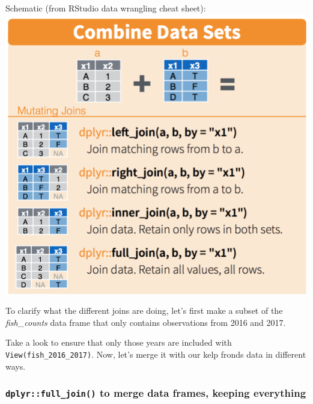 \documentclass[]{book}
\newenvironment{Shaded}{\begin{snugshade}}{\end{snugshade}}
\newcommand{\DecValTok}[1]{\textcolor[rgb]{0.00,0.00,0.81}{#1}}
\newcommand{\KeywordTok}[1]{\textcolor[rgb]{0.13,0.29,0.53}{\textbf{#1}}}
\newcommand{\NormalTok}[1]{#1}
\newcommand{\OperatorTok}[1]{\textcolor[rgb]{0.81,0.36,0.00}{\textbf{#1}}}
\newcommand{\StringTok}[1]{\textcolor[rgb]{0.31,0.60,0.02}{#1}}
\begin{document}
Schematic (from RStudio data wrangling cheat sheet):
\includegraphics{img/rstudio-cheatsheet-combine-options1.png}

To clarify what the different joins are doing, let's first make a subset of the \emph{fish\_counts} data frame that only contains observations from 2016 and 2017.

\begin{Shaded}
\end{Shaded}

Take a look to ensure that only those years are included with \texttt{View(fish\_2016\_2017)}. Now, let's merge it with our kelp fronds data in different ways.

\hypertarget{dplyrfull_join-to-merge-data-frames-keeping-everything}{%
\subsubsection{\texorpdfstring{\texttt{dplyr::full\_join()} to merge data frames, keeping everything}{dplyr::full\_join() to merge data frames, keeping everything}}\label{dplyrfull_join-to-merge-data-frames-keeping-everything}}
\end{document}
